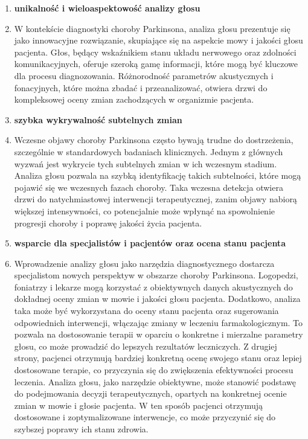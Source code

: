 \renewcommand{\labelenumi}{\alph{enumi})}
\begin{enumerate}
	\item \textbf{unikalność i wieloaspektowość analizy głosu}
	\item[] W kontekście diagnostyki choroby Parkinsona, analiza głosu prezentuje się jako innowacyjne rozwiązanie, skupiające się na aspekcie mowy i jakości głosu pacjenta. Głos, będący wskaźnikiem stanu układu nerwowego oraz zdolności komunikacyjnych, oferuje szeroką gamę informacji, które mogą być kluczowe dla procesu diagnozowania. Różnorodność parametrów akustycznych i fonacyjnych, które można zbadać i przeanalizować, otwiera drzwi do kompleksowej oceny zmian zachodzących w organizmie pacjenta.
	\item \textbf{szybka wykrywalność subtelnych zmian}
	\item[] Wczesne objawy choroby Parkinsona często bywają trudne do dostrzeżenia, szczególnie w standardowych badaniach klinicznych. Jednym z głównych wyzwań jest wykrycie tych subtelnych zmian w ich wczesnym stadium. Analiza głosu pozwala na szybką identyfikację takich subtelności, które mogą pojawić się we wczesnych fazach choroby. Taka wczesna detekcja otwiera drzwi do natychmiastowej interwencji terapeutycznej, zanim objawy nabiorą większej intensywności, co potencjalnie może wpłynąć na spowolnienie progresji choroby i poprawę jakości życia pacjenta.
	\item \textbf{wsparcie dla specjalistów i pacjentów oraz ocena stanu pacjenta}
	\item[] Wprowadzenie analizy głosu jako narzędzia diagnostycznego dostarcza specjalistom nowych perspektyw w obszarze choroby Parkinsona. Logopedzi, foniatrzy i lekarze mogą korzystać z obiektywnych danych akustycznych do dokładnej oceny zmian w mowie i jakości głosu pacjenta. Dodatkowo, analiza taka może być wykorzystana do oceny stanu pacjenta oraz sugerowania odpowiednich interwencji, włączając zmiany w leczeniu farmakologicznym. To pozwala na dostosowanie terapii w oparciu o konkretne i mierzalne parametry głosu, co może prowadzić do lepszych rezultatów leczniczych.
	Z drugiej strony, pacjenci otrzymują bardziej konkretną ocenę swojego stanu oraz lepiej dostosowane terapie, co przyczynia się do zwiększenia efektywności procesu leczenia. Analiza głosu, jako narzędzie obiektywne, może stanowić podstawę do podejmowania decyzji terapeutycznych, opartych na konkretnej ocenie zmian w mowie i głosie pacjenta. W ten sposób pacjenci otrzymują dostosowane i zoptymalizowane interwencje, co może przyczynić się do szybszej poprawy ich stanu zdrowia.

\end{enumerate}
